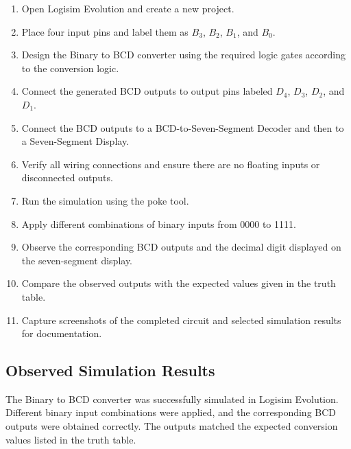 \documentclass[12pt,a4paper]{article}
\begin{document}
\begin{enumerate}
    \item Open Logisim Evolution and create a new project.
    
    \item Place four input pins and label them as $B_3$, $B_2$, $B_1$, and $B_0$.
    
    \item Design the Binary to BCD converter using the required logic gates according to the conversion logic.
    
    \item Connect the generated BCD outputs to output pins labeled $D_4$, $D_3$, $D_2$, and $D_1$.
    
    \item Connect the BCD outputs to a BCD-to-Seven-Segment Decoder and then to a Seven-Segment Display.
    
    \item Verify all wiring connections and ensure there are no floating inputs or disconnected outputs.
    
    \item Run the simulation using the poke tool.
    
    \item Apply different combinations of binary inputs from 0000 to 1111.
    
    \item Observe the corresponding BCD outputs and the decimal digit displayed on the seven-segment display.
    
    \item Compare the observed outputs with the expected values given in the truth table.
    
    \item Capture screenshots of the completed circuit and selected simulation results for documentation.
\end{enumerate}

\subsection{Observed Simulation Results}

The Binary to BCD converter was successfully simulated in Logisim Evolution. Different binary input combinations were applied, and the corresponding BCD outputs were obtained correctly. The outputs matched the expected conversion values listed in the truth table.
\end{document}
